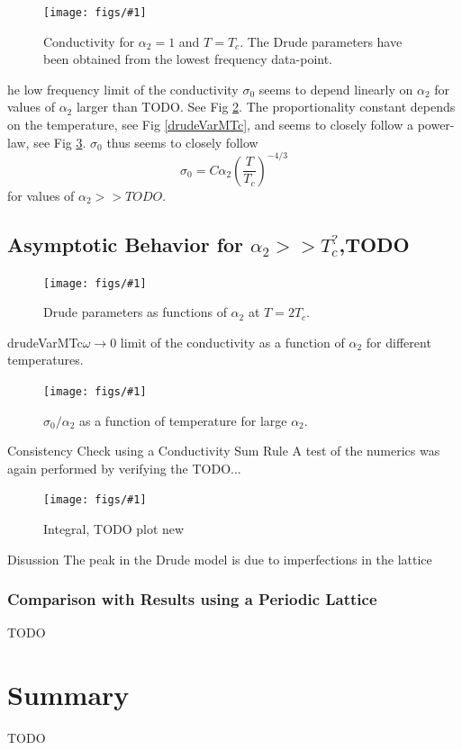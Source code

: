 \documentclass[12pt]{report}
\newcommand{\fig}[3]{
\begin{figure}
\centering
\texttt{[image: figs/\#1]}
\caption{#2}
\end{figure}
}
\begin{document}
\fig{drude_T_1Tc_a2_1}{Conductivity for $\alpha_2=1$ and $T=T_c$. The Drude parameters have been obtained from the lowest frequency data-point. \label{drude}}

The low frequency limit of the conductivity $\sigma_0$ seems to depend linearly on $\alpha_2$ for values of $\alpha_2$ larger than TODO. See Fig \ref{drudeVar2Tc}. The proportionality constant depends on the temperature, see Fig \ref{drudeVarMTc}, and seems to closely follow a power-law, see Fig \ref{drudeTdep_1e4}. $\sigma_0$ thus seems to closely follow
\begin{equation}
 \sigma_0=C\alpha_2\left(\frac{T}{T_c}\right)^{-4/3}
\end{equation}
for values of $\alpha_2>>TODO$.


\section{Asymptotic Behavior for $\alpha_2>>T_c^?$,TODO}
\fig{drudeVar2Tc}{Drude parameters as functions of $\alpha_2$ at $T=2T_c$.\label{drudeVar2Tc}}

\fig{drudeVarMTc}{$\omega\rightarrow0$ limit of the conductivity as a function of $\alpha_2$ for different temperatures.\label{drudeVarMTc}}

\fig{drudeTdep_1e4}{$\sigma_0/\alpha_2$ as a function of temperature for large $\alpha_2$.\label{drudeTdep_1e4}}
\section{Consistency Check using a Conductivity Sum Rule}
A test of the numerics was again performed by verifying the TODO...
\fig{sum_rule_a20}{Integral, TODO plot new}

\section{Disussion}
The peak in the Drude model is due to imperfections in the lattice
\subsection{Comparison with Results using a Periodic Lattice}
TODO
\chapter{Summary}
TODO
\end{document}
